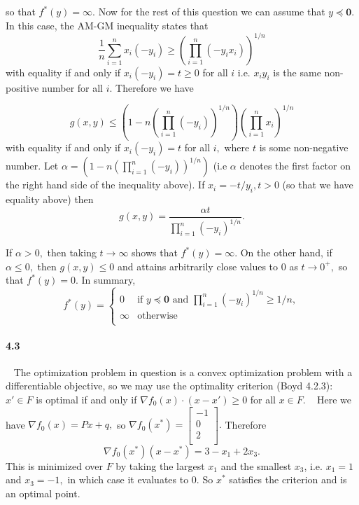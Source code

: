 \documentclass[a4paper,12pt]{article}
\newcommand{\p}{\prod}
\begin{document}
so that $f^*(y) = \infty.$ Now for the rest of this question we can assume that $y \preceq \mathbf{0}.$ In this case, the AM-GM inequality states that $$ \frac{1}{n} \sum_{i=1}^n x_i (-y_i) \geq \left( \p_{i=1}^n (-y_i x_i) \right)^{1/n}$$
with equality if and only if $x_i(-y_i) = t \geq 0$ for all $i$ i.e. $x_iy_i$ is the same non-positive number for all $i.$ Therefore we have 

$$ g(x,y) \leq \left( 1 - n \left(\p_{i=1}^n (-y_i)\right)^{1/n} \right) \left( \p_{i=1}^n x_i \right)^{1/n}$$ with equality if and only if $x_i(-y_i) = t$ for all $i,$ where $t$ is some non-negative number. Let $\alpha = \left( 1 - n \left(\p_{i=1}^n (-y_i)\right)^{1/n} \right)$ (i.e $\alpha$ denotes the first factor on the right hand side of the inequality above). If  $x_i = -t/y_i, t>0$ (so that we have equality above) then $$ g(x,y) = \frac{ \alpha t}{\p_{i=1}^n (-y_i)^{1/n}}.$$

If $\alpha > 0,$ then taking $t\to\infty$ shows that $f^*(y) = \infty.$ On the other hand, if $\alpha \leq 0,$ then $g(x,y)\leq 0$ and attains arbitrarily close values to $0$ as $t\to 0^+,$ so that $f^*(y) = 0.$ In summary, 
\[
  f^*(y) =
  \begin{cases}
                                   0 & \text{if $y \preceq \mathbf{0}$ and $\p_{i=1}^n (-y_i)^{1/n} \geq 1/n,$} \\
                                   \infty & \text{otherwise} \\
  \end{cases}
\]

\paragraph{4.3}
\
\newline
The optimization problem in question is a convex optimization problem with a differentiable objective, so we may use the optimality criterion (Boyd 4.2.3): $x'\in F$ is optimal if and only if $\nabla f_0(x) \cdot (x-x') \geq 0$ for all $x\in F.$ 
\
\newline
Here we have $\nabla f_0(x) = Px + q,$ so $\nabla f_0(x^*) = \begin{bmatrix}
    -1 \\
    0  \\
    2  \\
   
\end{bmatrix}.$ Therefore $$ \nabla f_0(x^*)(x-x^*) = 3 -x_1 + 2x_3.$$
This is minimized over $F$ by taking the largest $x_1$ and the smallest $x_3$, i.e. $x_1 = 1$ and $x_3 = -1,$ in which case it evaluates to $0.$ So $x^*$ satisfies the criterion and is an optimal point. 
\end{document}

